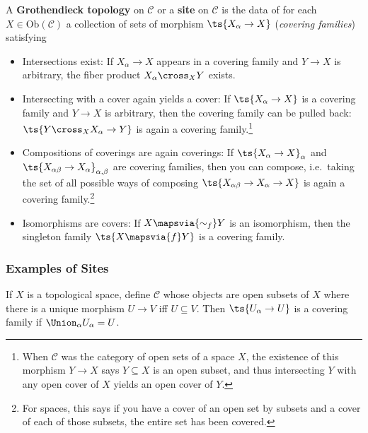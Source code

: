 \begin{definition}

A \textbf{Grothendieck topology} on \(\mathcal{C}\) or a \textbf{site}
on \(\mathcal{C}\) is the data of for each
\(X\in \mathrm{Ob}(\mathcal{C})\) a collection of sets of morphism
\(\ts{X_\alpha \to X}\) (\emph{covering families}) satisfying

\begin{itemize}
\item
  Intersections exist: If \(X_\alpha\to X\) appears in a covering family
  and \(Y\to X\) is arbitrary, the fiber product \(X_\alpha\cross_X Y\)
  exists.
\item
  Intersecting with a cover again yields a cover: If
  \(\ts{X_\alpha\to X}\) is a covering family and \(Y\to X\) is
  arbitrary, then the covering family can be pulled back:
  \(\ts{Y\cross_X X_\alpha\to Y}\) is again a covering
  family.\footnote{When \(\mathcal{C}\) was the category of open sets of
    a space \(X\), the existence of this morphism \(Y\to X\) says
    \(Y \subseteq X\) is an open subset, and thus intersecting \(Y\)
    with any open cover of \(X\) yields an open cover of \(Y\).}
\item
  Compositions of coverings are again coverings: If
  \(\ts{X_\alpha\to X}_{\alpha}\) and
  \(\ts{X_{\alpha\beta} \to X_\alpha}_{\alpha,\beta}\) are covering
  families, then you can compose, i.e.~taking the set of all possible
  ways of composing \(\ts{X_{\alpha\beta} \to X_\alpha \to X}\) is again
  a covering family.\footnote{For spaces, this says if you have a cover
    of an open set by subsets and a cover of each of those subsets, the
    entire set has been covered.}
\item
  Isomorphisms are covers: If \(X\mapsvia{\sim_f} Y\) is an isomorphism,
  then the singleton family \(\ts{X\mapsvia{f} Y}\) is a covering
  family.
\end{itemize}

\end{definition}

\hypertarget{examples-of-sites}{%
\subsubsection{Examples of Sites}\label{examples-of-sites}}

\begin{example}

If \(X\) is a topological space, define \(\mathcal{C}\) whose objects
are open subsets of \(X\) where there is a unique morphism \(U\to V\)
iff \(U\subseteq V\). Then \(\ts{U_\alpha \to U}\) is a covering family
if \(\Union_\alpha U_\alpha = U\).

\end{example}

